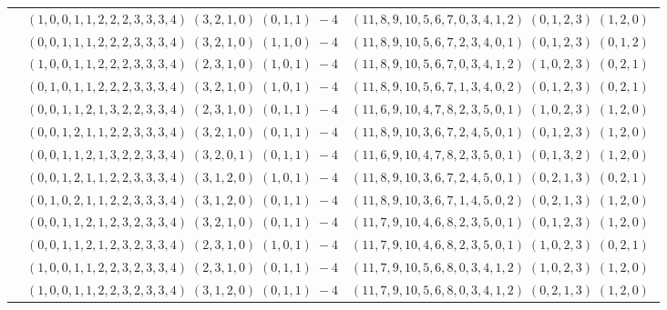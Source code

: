 \documentclass[11pt]{article}
\begin{document}
\begin{longtable}[l]{|c|c|c|}
 \cline{2-3} 
 & $(1 ,0 ,0 ,1 ,1 ,2 ,2 ,2 ,3 ,3 ,3 ,4) \;(3 ,2 ,1 ,0) \;(0 ,1 ,1) \;-4$ & $(11 ,8 ,9 ,10 ,5 ,6 ,7 ,0 ,3 ,4 ,1 ,2) \;(0 ,1 ,2 ,3) \;(1 ,2 ,0) \;$\\ 
 \cline{2-3} 
 & $(0 ,0 ,1 ,1 ,1 ,2 ,2 ,2 ,3 ,3 ,3 ,4) \;(3 ,2 ,1 ,0) \;(1 ,1 ,0) \;-4$ & $(11 ,8 ,9 ,10 ,5 ,6 ,7 ,2 ,3 ,4 ,0 ,1) \;(0 ,1 ,2 ,3) \;(0 ,1 ,2) \;$\\ 
 \cline{2-3} 
 & $(1 ,0 ,0 ,1 ,1 ,2 ,2 ,2 ,3 ,3 ,3 ,4) \;(2 ,3 ,1 ,0) \;(1 ,0 ,1) \;-4$ & $(11 ,8 ,9 ,10 ,5 ,6 ,7 ,0 ,3 ,4 ,1 ,2) \;(1 ,0 ,2 ,3) \;(0 ,2 ,1) \;$\\ 
 \cline{2-3} 
 & $(0 ,1 ,0 ,1 ,1 ,2 ,2 ,2 ,3 ,3 ,3 ,4) \;(3 ,2 ,1 ,0) \;(1 ,0 ,1) \;-4$ & $(11 ,8 ,9 ,10 ,5 ,6 ,7 ,1 ,3 ,4 ,0 ,2) \;(0 ,1 ,2 ,3) \;(0 ,2 ,1) \;$\\ 
 \cline{2-3} 
 & $(0 ,0 ,1 ,1 ,2 ,1 ,3 ,2 ,2 ,3 ,3 ,4) \;(2 ,3 ,1 ,0) \;(0 ,1 ,1) \;-4$ & $(11 ,6 ,9 ,10 ,4 ,7 ,8 ,2 ,3 ,5 ,0 ,1) \;(1 ,0 ,2 ,3) \;(1 ,2 ,0) \;$\\ 
 \cline{2-3} 
 & $(0 ,0 ,1 ,2 ,1 ,1 ,2 ,2 ,3 ,3 ,3 ,4) \;(3 ,2 ,1 ,0) \;(0 ,1 ,1) \;-4$ & $(11 ,8 ,9 ,10 ,3 ,6 ,7 ,2 ,4 ,5 ,0 ,1) \;(0 ,1 ,2 ,3) \;(1 ,2 ,0) \;$\\ 
 \cline{2-3} 
 & $(0 ,0 ,1 ,1 ,2 ,1 ,3 ,2 ,2 ,3 ,3 ,4) \;(3 ,2 ,0 ,1) \;(0 ,1 ,1) \;-4$ & $(11 ,6 ,9 ,10 ,4 ,7 ,8 ,2 ,3 ,5 ,0 ,1) \;(0 ,1 ,3 ,2) \;(1 ,2 ,0) \;$\\ 
 \cline{2-3} 
 & $(0 ,0 ,1 ,2 ,1 ,1 ,2 ,2 ,3 ,3 ,3 ,4) \;(3 ,1 ,2 ,0) \;(1 ,0 ,1) \;-4$ & $(11 ,8 ,9 ,10 ,3 ,6 ,7 ,2 ,4 ,5 ,0 ,1) \;(0 ,2 ,1 ,3) \;(0 ,2 ,1) \;$\\ 
 \cline{2-3} 
 & $(0 ,1 ,0 ,2 ,1 ,1 ,2 ,2 ,3 ,3 ,3 ,4) \;(3 ,1 ,2 ,0) \;(0 ,1 ,1) \;-4$ & $(11 ,8 ,9 ,10 ,3 ,6 ,7 ,1 ,4 ,5 ,0 ,2) \;(0 ,2 ,1 ,3) \;(1 ,2 ,0) \;$\\ 
 \cline{2-3} 
 & $(0 ,0 ,1 ,1 ,2 ,1 ,2 ,3 ,2 ,3 ,3 ,4) \;(3 ,2 ,1 ,0) \;(0 ,1 ,1) \;-4$ & $(11 ,7 ,9 ,10 ,4 ,6 ,8 ,2 ,3 ,5 ,0 ,1) \;(0 ,1 ,2 ,3) \;(1 ,2 ,0) \;$\\ 
 \cline{2-3} 
 & $(0 ,0 ,1 ,1 ,2 ,1 ,2 ,3 ,2 ,3 ,3 ,4) \;(2 ,3 ,1 ,0) \;(1 ,0 ,1) \;-4$ & $(11 ,7 ,9 ,10 ,4 ,6 ,8 ,2 ,3 ,5 ,0 ,1) \;(1 ,0 ,2 ,3) \;(0 ,2 ,1) \;$\\ 
 \cline{2-3} 
 & $(1 ,0 ,0 ,1 ,1 ,2 ,2 ,3 ,2 ,3 ,3 ,4) \;(2 ,3 ,1 ,0) \;(0 ,1 ,1) \;-4$ & $(11 ,7 ,9 ,10 ,5 ,6 ,8 ,0 ,3 ,4 ,1 ,2) \;(1 ,0 ,2 ,3) \;(1 ,2 ,0) \;$\\ 
 \cline{2-3} 
 & $(1 ,0 ,0 ,1 ,1 ,2 ,2 ,3 ,2 ,3 ,3 ,4) \;(3 ,1 ,2 ,0) \;(0 ,1 ,1) \;-4$ & $(11 ,7 ,9 ,10 ,5 ,6 ,8 ,0 ,3 ,4 ,1 ,2) \;(0 ,2 ,1 ,3) \;(1 ,2 ,0) \;$\\ 

\end{longtable}
\end{document}
